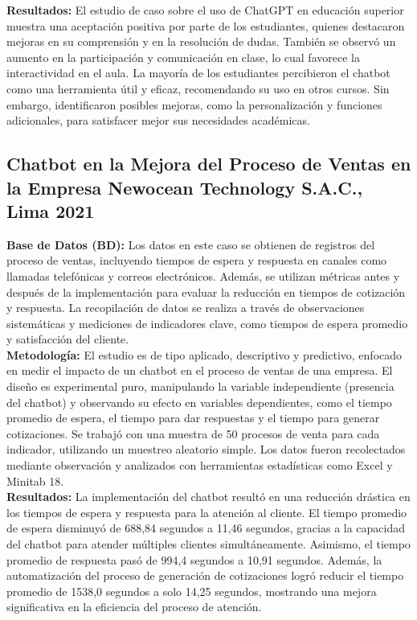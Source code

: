 \documentclass[10pt,a4paper]{article}
\begin{document}
\textbf{Resultados:} El estudio de caso sobre el uso de ChatGPT en educación superior muestra una aceptación positiva por parte de los estudiantes, quienes destacaron mejoras en su comprensión y en la resolución de dudas. También se observó un aumento en la participación y comunicación en clase, lo cual favorece la interactividad en el aula. La mayoría de los estudiantes percibieron el chatbot como una herramienta útil y eficaz, recomendando su uso en otros cursos. Sin embargo, identificaron posibles mejoras, como la personalización y funciones adicionales, para satisfacer mejor sus necesidades académicas. \\


\subsection{Chatbot en la Mejora del Proceso de Ventas en la Empresa Newocean Technology S.A.C., Lima 2021}

\textbf{Base de Datos (BD):} Los datos en este caso se obtienen de registros del proceso de ventas, incluyendo tiempos de espera y respuesta en canales como llamadas telefónicas y correos electrónicos. Además, se utilizan métricas antes y después de la implementación para evaluar la reducción en tiempos de cotización y respuesta. La recopilación de datos se realiza a través de observaciones sistemáticas y mediciones de indicadores clave, como tiempos de espera promedio y satisfacción del cliente. \\

\textbf{Metodología:} El estudio es de tipo aplicado, descriptivo y predictivo, enfocado en medir el impacto de un chatbot en el proceso de ventas de una empresa. El diseño es experimental puro, manipulando la variable independiente (presencia del chatbot) y observando su efecto en variables dependientes, como el tiempo promedio de espera, el tiempo para dar respuestas y el tiempo para generar cotizaciones. Se trabajó con una muestra de 50 procesos de venta para cada indicador, utilizando un muestreo aleatorio simple. Los datos fueron recolectados mediante observación y analizados con herramientas estadísticas como Excel y Minitab 18. \\

\textbf{Resultados:} La implementación del chatbot resultó en una reducción drástica en los tiempos de espera y respuesta para la atención al cliente. El tiempo promedio de espera disminuyó de 688,84 segundos a 11,46 segundos, gracias a la capacidad del chatbot para atender múltiples clientes simultáneamente. Asimismo, el tiempo promedio de respuesta pasó de 994,4 segundos a 10,91 segundos. Además, la automatización del proceso de generación de cotizaciones logró reducir el tiempo promedio de 1538,0 segundos a solo 14,25 segundos, mostrando una mejora significativa en la eficiencia del proceso de atención. \\
\end{document}
